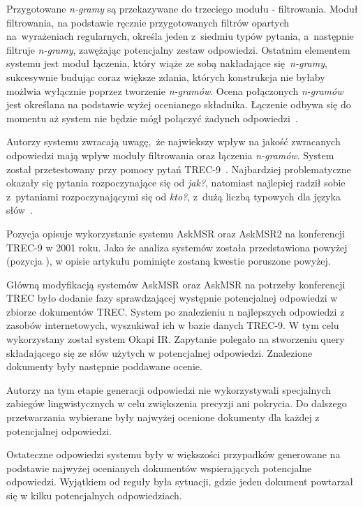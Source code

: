 Przygotowane \emph{n-gramy} są przekazywane do trzeciego modułu - filtrowania. Moduł filtrowania, na podstawie ręcznie przygotowanych filtrów opartych na~wyrażeniach regularnych, określa jeden z~siedmiu typów pytania, a~następnie filtruje \emph{n-gramy}, zawężając potencjalny zestaw odpowiedzi. Ostatnim elementem systemu jest moduł łączenia, który wiąże ze sobą nakładające się \emph{n-gramy}, sukcesywnie budując coraz większe zdania, których konstrukcja nie byłaby możlwia wyłącznie poprzez tworzenie \emph{n-gramów}. Ocena połączonych \emph{n-gramów} jest określana na podstawie wyżej ocenianego składnika. Łączenie odbywa się do momentu aż system nie będzie mógł połączyć żadynch odpowiedzi~\cite{brill2002analysis}.

Autorzy systemu zwracają uwagę, że najwiekszy wpływ na jakość zwracanych odpowiedzi mają wpływ moduły filtrowania oraz łączenia \emph{n-gramów}. System został przetestowany przy pomocy pytań TREC-9~\cite{voorhees2001trec}. Najbardziej problematyczne okazały się pytania rozpoczynające się od \emph{jak?}, natomiast najlepiej radził sobie z~pytaniami rozpoczynającymi się od \emph{kto?}, z~dużą liczbą typowych dla języka słów~\cite{brill2002analysis}.

Pozycja \cite{brill2001data} opisuje wykorzystanie systemu AskMSR oraz AskMSR2 na konferencji TREC-9 w 2001 roku. Jako że analiza systemów została przedstawiona powyżej (pozycja \cite{brill2002analysis}), w opisie artykułu pominięte zostaną kwestie poruszone powyżej.

Główną modyfikacją systemów AskMSR oraz AskMSR na potrzeby konferencji TREC było dodanie fazy sprawdzającej występnie potencjalnej odpowiedzi w zbiorze dokumentów TREC. System po znalezieniu n najlepszych odpowiedzi z zasobów internetowych, wyszukiwał ich w bazie danych TREC-9. W tym celu wykorzystany został system Okapi IR. Zapytanie polegało na stworzeniu query składającego się ze słów użytych w potencjalnej odpowiedzi. Znalezione dokumenty były następnie poddawane ocenie.

Autorzy \cite{brill2001data} na tym etapie generacji odpowiedzi nie wykorzystywali specjalnych zabiegów lingwistycznych w celu zwiększenia precyzji ani pokrycia. Do dalszego przetwarzania wybierane były najwyżej ocenione dokumenty dla każdej z potencjalnej odpowiedzi.

Ostateczne odpowiedzi systemu były w większości przypadków generowane na podstawie najwyżej ocenianych dokumentów wspierających potencjalne odpowiedzi. Wyjątkiem od reguły była sytuacji, gdzie jeden dokument powtarzał się w kilku potencjalnych odpowiedziach.


